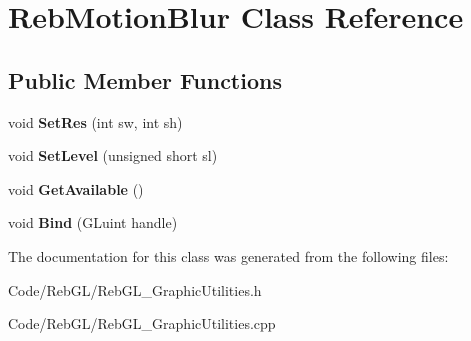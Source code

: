 \hypertarget{class_reb_motion_blur}{}\section{Reb\+Motion\+Blur Class Reference}
\label{class_reb_motion_blur}
\subsection*{Public Member Functions}
\begin{DoxyCompactItemize}
\item 
void {\bfseries Set\+Res} (int sw, int sh)\hypertarget{class_reb_motion_blur_a2efc3fa99bfee380e9fe4e775d740af0}{}\label{class_reb_motion_blur_a2efc3fa99bfee380e9fe4e775d740af0}

\item 
void {\bfseries Set\+Level} (unsigned short sl)\hypertarget{class_reb_motion_blur_af81d439146330ea5d11957c7f0b9d660}{}\label{class_reb_motion_blur_af81d439146330ea5d11957c7f0b9d660}

\item 
void {\bfseries Get\+Available} ()\hypertarget{class_reb_motion_blur_a5e8d4943b54be38903d40db983334994}{}\label{class_reb_motion_blur_a5e8d4943b54be38903d40db983334994}

\item 
void {\bfseries Bind} (G\+Luint handle)\hypertarget{class_reb_motion_blur_a153a9fb548641a8fe1e4fde4e3e8c0b9}{}\label{class_reb_motion_blur_a153a9fb548641a8fe1e4fde4e3e8c0b9}

\end{DoxyCompactItemize}


The documentation for this class was generated from the following files\+:\begin{DoxyCompactItemize}
\item 
Code/\+Reb\+G\+L/Reb\+G\+L\+\_\+\+Graphic\+Utilities.\+h\item 
Code/\+Reb\+G\+L/Reb\+G\+L\+\_\+\+Graphic\+Utilities.\+cpp\end{DoxyCompactItemize}
